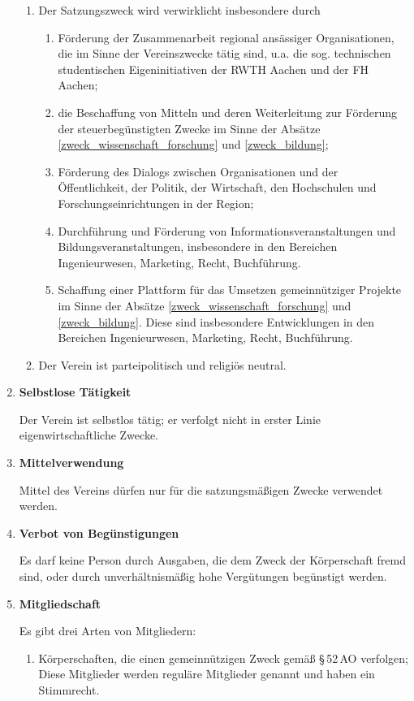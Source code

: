 \documentclass[german]{article}
\newcommand{\paragr}[1]{\item \textsf{\textbf{#1}}}
\begin{document}
\begin{enumerate}
\begin{enumerate}
\item Der Satzungszweck wird verwirklicht insbesondere durch
\begin{enumerate}
\item Förderung der Zusammenarbeit regional ansässiger Organisationen, die im Sinne der Vereinszwecke tätig sind, u.a. die sog. technischen studentischen Eigeninitiativen der RWTH Aachen und der FH Aachen;
\item die Beschaffung von Mitteln und deren Weiterleitung zur Förderung der steuerbegünstigten Zwecke im Sinne der Absätze \ref{zweck_wissenschaft_forschung} und \ref{zweck_bildung};
\item Förderung des Dialogs zwischen Organisationen und der Öffentlichkeit, der Politik, der Wirtschaft, den Hochschulen und Forschungseinrichtungen in der Region;
\item Durchführung und Förderung von Informationsveranstaltungen und Bildungsveranstaltungen, insbesondere in den Bereichen Ingenieurwesen, Marketing, Recht, Buchführung.
\item Schaffung einer Plattform für das Umsetzen gemeinnütziger Projekte im Sinne der Absätze \ref{zweck_wissenschaft_forschung} und \ref{zweck_bildung}. Diese sind insbesondere Entwicklungen in den Bereichen Ingenieurwesen, Marketing, Recht, Buchführung.
\end{enumerate}

\item Der Verein ist parteipolitisch und religiös neutral.

\end{enumerate}

\paragr{Selbstlose Tätigkeit}

Der Verein ist selbstlos tätig; er verfolgt nicht in erster Linie eigenwirtschaftliche Zwecke.


\paragr{Mittelverwendung}

Mittel des Vereins dürfen nur für die satzungsmäßigen Zwecke verwendet werden.


\paragr{Verbot von Begünstigungen}

Es darf keine Person durch Ausgaben, die dem Zweck der Körperschaft fremd sind, oder durch unverhältnismäßig hohe Vergütungen begünstigt werden.


\paragr{Mitgliedschaft}
\label{mitglieder}

Es gibt drei Arten von Mitgliedern:

\begin{enumerate}

\item Körperschaften, die einen gemeinnützigen Zweck gemäß §\,52\,AO verfolgen; Diese Mitglieder werden reguläre Mitglieder genannt und haben ein Stimmrecht. \label{mitglieder_regulaer}


\end{enumerate}
\end{enumerate}
\end{document}
